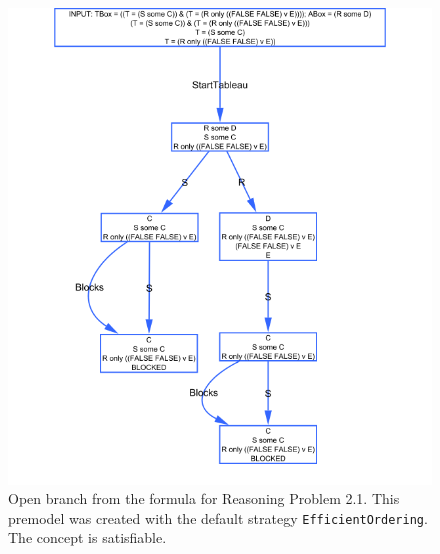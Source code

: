 \documentclass[11pt]{article} %
\begin{document}
\begin{figure}
\begin{center}
\includegraphics[scale=0.4]{premodel21Open.png}
\caption{Open branch from the formula for Reasoning Problem 2.1. This premodel was created with the default strategy \texttt{EfficientOrdering}. The concept is satisfiable.}
\label{fig:21Open}
\end{center}
\end{figure}


\subsection{}
\end{document}
